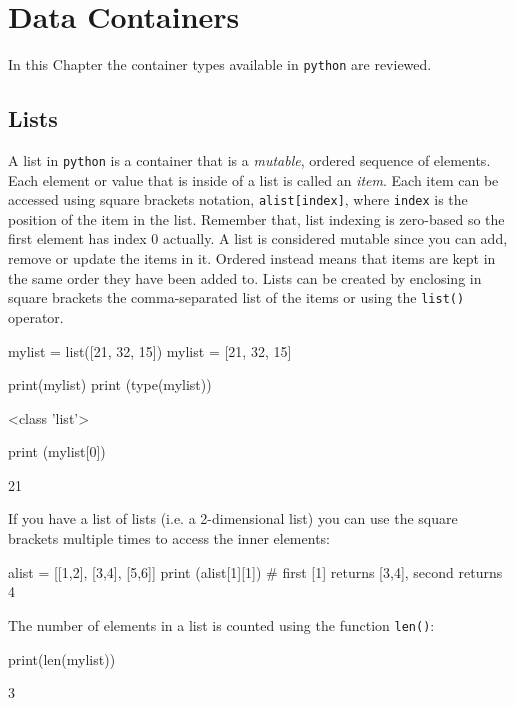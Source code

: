 \chapter{Data Containers}
\label{sec:datacontainer}

In this Chapter the container types available in \texttt{python} are reviewed.

\section{Lists}
\label{lists}

A list in \texttt{python} is a container that is a \emph{mutable}, ordered sequence of elements. Each element or value that is inside of a list is called an \emph{item}. Each item can be accessed using square brackets notation, \texttt{alist[index]}, where \texttt{index} is the position of the item in the list.
Remember that, list indexing is zero-based so the first element has index 0 actually. A list is considered mutable since you can add, remove or update the items in it. Ordered instead means that items are kept in the same order they have been added to. Lists can be created by enclosing in square brackets the comma-separated list of the items or using the \texttt{list()} operator.

\begin{ipython}
mylist = list([21, 32, 15])
mylist = [21, 32, 15]

print(mylist)
print (type(mylist))
\end{ipython}
\begin{ioutput}
[21, 32, 15]
<class 'list'>
\end{ioutput}

\begin{ipython}
print (mylist[0])
\end{ipython}
\begin{ioutput}
21
\end{ioutput}

If you have a list of lists (i.e. a 2-dimensional list) you can use the square brackets
multiple times to access the inner elements:
\begin{ipython}
alist = [[1,2], [3,4], [5,6]]
print (alist[1][1]) # first [1] returns [3,4], second returns 4                 
\end{ipython}  

The number of elements in a list is counted using the function \texttt{len()}:
\begin{ipython}
print(len(mylist))
\end{ipython}
\begin{ioutput}
3
\end{ioutput}

